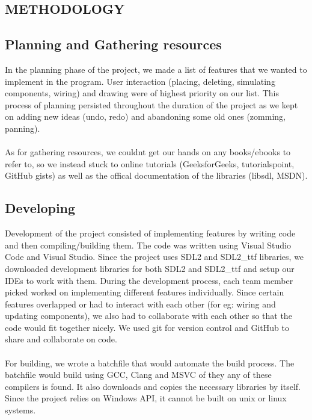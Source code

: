 \documentclass[report.tex]{subfiles}
\begin{document}
\newpage
\begin{large}
    \section{METHODOLOGY}
    \subsection{Planning and Gathering resources}

    In the planning phase of the project, we made a list of features that we wanted to implement in the program.
    User interaction (placing, deleting, simulating components, wiring) and drawing were of highest priority on our list.
    This process of planning persisted throughout the duration of the project as we kept on adding new ideas (undo, redo) and abandoning some old ones (zomming, panning).\\\\
    As for gathering resources, we couldnt get our hands on any books/ebooks to refer to, so we instead stuck to online tutorials (GeeksforGeeks, tutorialspoint, GitHub gists)
    as well as the offical documentation of the libraries (libsdl, MSDN).
    \subsection{Developing}

    Development of the project consisted of implementing features by writing code and then compiling/building them. The code was written using Visual Studio Code and Visual Studio. 
    Since the project uses SDL2 and SDL2\_ttf libraries, we downloaded development libraries for both SDL2 and SDL2\_ttf and setup our IDEs to work with them. 
    During the development process, each team member picked worked on implementing different features individually.
    Since certain features overlapped or had to interact with each other (for eg: wiring and updating components), we also had to collaborate with each other so that the code would fit together nicely. We used git for version control and GitHub to share and collaborate on code.\\\\
    For building, we wrote a batchfile that would automate the build process. The batchfile would build using GCC, Clang and MSVC of they any of these compilers is found. 
    It also downloads and copies the necessary libraries by itself. Since the project relies on Windows API, it cannot be built on unix or linux systems.

\end{large}
\end{document}
